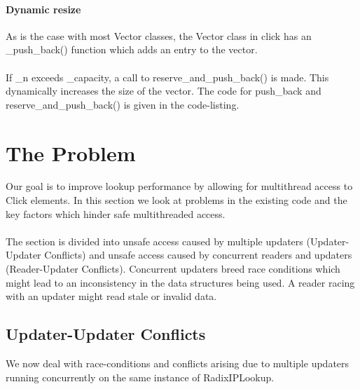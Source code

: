 \documentclass{article}
\begin{document}
\paragraph{Dynamic resize}
As is the case with most Vector classes, the Vector class in click has an \_push\_back() function which adds an entry to the vector.
\\\\ If \_n exceeds \_capacity, a call to reserve\_and\_push\_back() is made. This dynamically increases the size of the vector. The code for push\_back and reserve\_and\_push\_back() is given in the code-listing.

\section{The Problem}
Our goal is to improve lookup performance by allowing for multithread access to Click elements. In this section we look at problems in the existing code and the key factors which hinder safe multithreaded access.
\\\\The section is divided into unsafe access caused by multiple updaters (Updater-Updater Conflicts) and unsafe access caused by concurrent readers and updaters (Reader-Updater Conflicts). Concurrent updaters breed race conditions which might lead to an inconsistency in the data structures being used. A reader racing with an updater might read stale or invalid data.
\subsection{Updater-Updater Conflicts}
We now deal with race-conditions and conflicts arising due to multiple updaters running concurrently on the same instance of RadixIPLookup.
\end{document}
